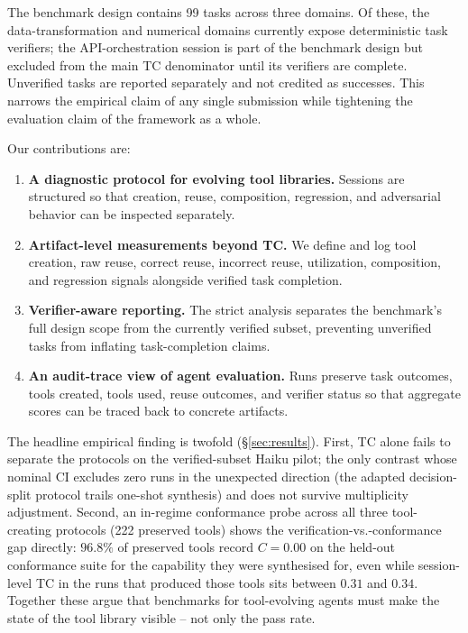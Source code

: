 \documentclass[sigconf,anonymous,review,natbib=false]{acmart}
\begin{document}
The benchmark design contains 99 tasks across three domains. Of these, the data-transformation and numerical domains currently expose deterministic task verifiers; the API-orchestration session is part of the benchmark design but excluded from the main TC denominator until its verifiers are complete. Unverified tasks are reported separately and not credited as successes. This narrows the empirical claim of any single submission while tightening the evaluation claim of the framework as a whole.

Our contributions are:
\begin{enumerate}[leftmargin=1.2em]
  \item \textbf{A diagnostic protocol for evolving tool libraries.} Sessions are structured so that creation, reuse, composition, regression, and adversarial behavior can be inspected separately.
  \item \textbf{Artifact-level measurements beyond TC.} We define and log tool creation, raw reuse, correct reuse, incorrect reuse, utilization, composition, and regression signals alongside verified task completion.
  \item \textbf{Verifier-aware reporting.} The strict analysis separates the benchmark's full design scope from the currently verified subset, preventing unverified tasks from inflating task-completion claims.
  \item \textbf{An audit-trace view of agent evaluation.} Runs preserve task outcomes, tools created, tools used, reuse outcomes, and verifier status so that aggregate scores can be traced back to concrete artifacts.
\end{enumerate}

The headline empirical finding is twofold (\S\ref{sec:results}). First, TC alone fails to separate the protocols on the verified-subset Haiku pilot; the only contrast whose nominal CI excludes zero runs in the unexpected direction (the adapted decision-split protocol trails one-shot synthesis) and does not survive multiplicity adjustment. Second, an in-regime conformance probe across all three tool-creating protocols (222 preserved tools) shows the verification-vs.-conformance gap directly: $96.8\%$ of preserved tools record $C{=}0.00$ on the held-out conformance suite for the capability they were synthesised for, even while session-level TC in the runs that produced those tools sits between $0.31$ and $0.34$. Together these argue that benchmarks for tool-evolving agents must make the state of the tool library visible -- not only the pass rate.
\end{document}
